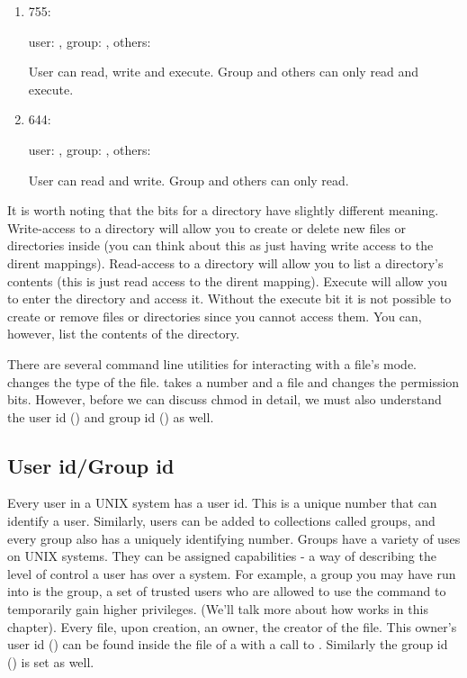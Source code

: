 \begin{enumerate}

\item 755: 

user: , group: , others: 

User can read, write and execute. Group and others can only read and execute.

\item 644: 

user: , group: , others: 

User can read and write. Group and others can only read.

\end{enumerate}

It is worth noting that the  bits for a directory have slightly different meaning. Write-access to a directory will allow you to create or delete new files or directories inside (you can think about this as just having write access to the dirent mappings). Read-access to a directory will allow you to list a directory's contents (this is just read access to the dirent mapping). Execute will allow you to enter the directory and access it. Without the execute bit it is not possible to create or remove files or directories since you cannot access them. You can, however, list the contents of the directory.

There are several command line utilities for interacting with a file's mode.  changes the type of the file.  takes a number and a file and changes the permission bits. However, before we can discuss chmod in detail, we must also understand the user id () and group id () as well.

\subsection{User id/Group id}
Every user in a UNIX system has a user id. This is a unique number that can identify a user. Similarly, users can be added to collections called groups, and every group also has a uniquely identifying number. Groups have a variety of uses on UNIX systems. They can be assigned capabilities - a way of describing the level of control a user has over a system. For example, a group you may have run into is the  group, a set of trusted users who are allowed to use the command  to temporarily gain higher privileges. (We'll talk more about how  works in this chapter). Every file, upon creation, an owner, the creator of the file. This owner's user id () can be found inside the  file of a  with a call to . Similarly the group id () is set as well.

